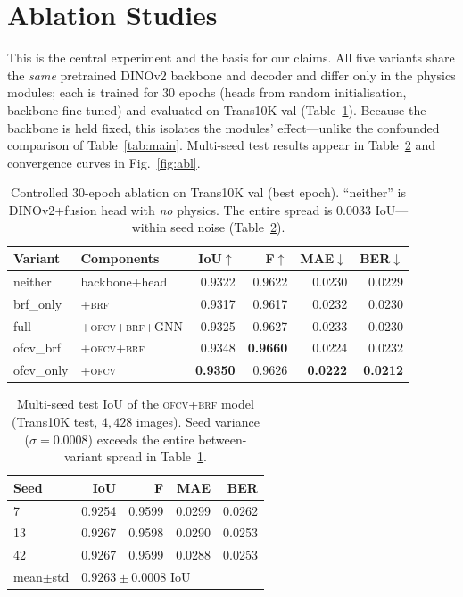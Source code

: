 \documentclass{article}
\newcommand{\ofcv}{\textsc{ofcv}}
\newcommand{\brf}{\textsc{brf}}
\newcommand{\dinov}{DINOv2}
\newcommand{\iou}{IoU}
\newcommand{\best}[1]{\textbf{#1}}
\begin{document}
\section{Ablation Studies}
\label{sec:ablation}
This is the central experiment and the basis for our claims. All five variants
share the \emph{same} pretrained \dinov{} backbone and decoder and differ only in
the physics modules; each is trained for $30$ epochs (heads from random
initialisation, backbone fine-tuned) and evaluated on Trans10K val
(Table~\ref{tab:ablation}). Because the backbone is held fixed, this isolates the
modules' effect---unlike the confounded comparison of Table~\ref{tab:main}.
Multi-seed test results appear in Table~\ref{tab:seeds} and convergence curves in
Fig.~\ref{fig:abl}.

\begin{table}[t]
\centering
\caption{Controlled 30-epoch ablation on Trans10K val (best epoch).
``neither'' is \dinov{}+fusion head with \emph{no} physics. The entire spread is
$0.0033$ \iou---within seed noise (Table~\ref{tab:seeds}).}
\label{tab:ablation}
\setlength{\tabcolsep}{4pt}
\begin{tabular}{llrrrr}
\toprule
Variant & Components & \iou$\uparrow$ & F$\uparrow$ & MAE$\downarrow$ & BER$\downarrow$ \\
\midrule
neither   & backbone+head     & 0.9322 & 0.9622 & 0.0230 & 0.0229 \\
brf\_only & {+}\brf           & 0.9317 & 0.9617 & 0.0232 & 0.0230 \\
full      & {+}\ofcv{+}\brf{+}GNN & 0.9325 & 0.9627 & 0.0233 & 0.0230 \\
ofcv\_brf & {+}\ofcv{+}\brf   & 0.9348 & \best{0.9660} & 0.0224 & 0.0232 \\
ofcv\_only& {+}\ofcv          & \best{0.9350} & 0.9626 & \best{0.0222} & \best{0.0212} \\
\bottomrule
\end{tabular}
\end{table}

\begin{table}[t]
\centering
\caption{Multi-seed test \iou{} of the \ofcv{+}\brf{} model (Trans10K test,
$4{,}428$ images). Seed variance ($\sigma=0.0008$) exceeds the entire
between-variant spread in Table~\ref{tab:ablation}.}
\label{tab:seeds}
\begin{tabular}{lrrrr}
\toprule
Seed & \iou & F & MAE & BER \\
\midrule
7  & 0.9254 & 0.9599 & 0.0299 & 0.0262 \\
13 & 0.9267 & 0.9598 & 0.0290 & 0.0253 \\
42 & 0.9267 & 0.9599 & 0.0288 & 0.0253 \\
\midrule
mean$\pm$std & \multicolumn{4}{l}{$0.9263\pm0.0008$ \iou} \\
\bottomrule
\end{tabular}
\end{table}
\end{document}
